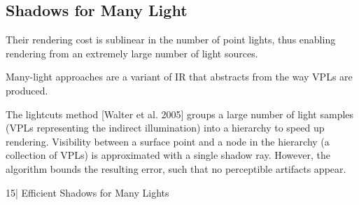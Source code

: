\subsection{Shadows for Many Light}


Their rendering cost is sublinear in the number of point lights, thus enabling rendering from an extremely large number of light sources.


Many-light approaches are a variant of IR that abstracts from the way VPLs are produced.



The lightcuts method [Walter et al. 2005] groups a large number of light samples (VPLs representing the indirect illumination) into a hierarchy to speed up rendering. Visibility between a surface point and a node in the hierarchy (a collection of VPLs) is approximated with a single shadow ray. However, the algorithm bounds the resulting error, such that no perceptible artifacts appear. 













15| Efficient Shadows for Many Lights




















